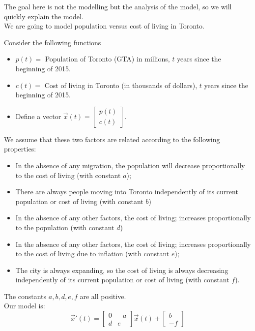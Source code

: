 \begin{example}
The goal here is not the modelling but the analysis of the model, so we will quickly explain the model. \\

We are going to model population versus cost of living in Toronto.


Consider the following functions
\begin{itemize}
\item $p(t) = $ Population of Toronto (GTA) in millions, $t$ years since the beginning of 2015.
\item $c(t) = $ Cost of living in Toronto (in thousands of dollars), $t$ years since the beginning of 2015.
\item Define a vector $\vec{x}(t) = \begin{bmatrix} p(t) \\ c(t) \end{bmatrix}$.
\end{itemize}

We assume that these two factors are related according to the following properties:
\begin{itemize}
\item In the absence of any migration, the population will decrease proportionally to the cost of living (with constant $a$);
\item There are always people moving into Toronto independently of its current population or cost of living (with constant $b$)
\item In the absence of any other factors, the cost of living; increases proportionally to the population (with constant $d$)
\item In the absence of any other factors, the cost of living; increases proportionally to the cost of living due to inflation (with constant $e$);
\item The city is always expanding, so the cost of living is always decreasing independently of its current population or cost of living (with constant $f$).
\end{itemize}
The constants $a,b,d,e,f$ are all positive. \\

Our model is:
$$
\vec{x}'(t) = 
	\begin{bmatrix}
 		0 & -a \\
 		d & e
	\end{bmatrix}
					\vec{x}(t) + 
	\begin{bmatrix}
		b \\ -f
	\end{bmatrix}
$$
\end{example}

